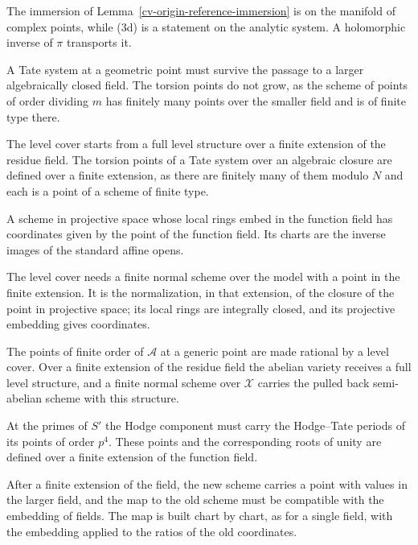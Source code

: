 The immersion of Lemma~\ref{cv-origin-reference-immersion} is on the manifold of complex points, while (3d) is a
statement on the analytic system. A holomorphic inverse of $\pi$ transports it.

A Tate system at a geometric point must survive the passage to a larger algebraically closed field. The torsion points
do not grow, as the scheme of points of order dividing $m$ has finitely many points over the smaller field and is of
finite type there.

The level cover starts from a full level structure over a finite extension of the residue field. The torsion points of
a Tate system over an algebraic closure are defined over a finite extension, as there are finitely many of them modulo
$N$ and each is a point of a scheme of finite type.

A scheme in projective space whose local rings embed in the function field has coordinates given by the point of the
function field. Its charts are the inverse images of the standard affine opens.

The level cover needs a finite normal scheme over the model with a point in the finite extension. It is the
normalization, in that extension, of the closure of the point in projective space; its local rings are integrally
closed, and its projective embedding gives coordinates.

The points of finite order of $\mathcal A$ at a generic point are made rational by a level cover. Over a finite
extension of the residue field the abelian variety receives a full level structure, and a finite normal scheme over
$\mathcal X$ carries the pulled back semi-abelian scheme with this structure.

At the primes of $S'$ the Hodge component must carry the Hodge--Tate periods of its points of order $p^4$. These
points and the corresponding roots of unity are defined over a finite extension of the function field.

After a finite extension of the field, the new scheme carries a point with values in the larger field, and the map to
the old scheme must be compatible with the embedding of fields. The map is built chart by chart, as for a single field,
with the embedding applied to the ratios of the old coordinates.

